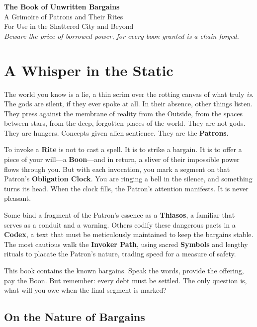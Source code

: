 \documentclass[10pt, twoside]{book}
\begin{document}
\begin{titlepage}
    \centering
    {\Huge\bfseries The Book of Unwritten Bargains}\\[2cm]
    {\Large A Grimoire of Patrons and Their Rites}\\[1cm]
    {\large For Use in the Shattered City and Beyond}\\[3cm]
    \vfill
    {\itshape Beware the price of borrowed power, for every boon granted is a chain forged.}\\
\end{titlepage}

\chapter*{A Whisper in the Static}

The world you know is a lie, a thin scrim over the rotting canvas of what truly \textit{is}. The gods are silent, if they ever spoke at all. In their absence, other things listen. They press against the membrane of reality from the Outside, from the spaces between stars, from the deep, forgotten places of the world. They are not gods. They are hungers. Concepts given alien sentience. They are the \textbf{Patrons}.

To invoke a \textbf{Rite} is not to cast a spell. It is to strike a bargain. It is to offer a piece of your will—a \textbf{Boon}—and in return, a sliver of their impossible power flows through you. But with each invocation, you mark a segment on that Patron's \textbf{Obligation Clock}. You are ringing a bell in the silence, and something turns its head. When the clock fills, the Patron's attention manifests. It is never pleasant.

Some bind a fragment of the Patron's essence as a \textbf{Thiasos}, a familiar that serves as a conduit and a warning. Others codify these dangerous pacts in a \textbf{Codex}, a text that must be meticulously maintained to keep the bargains stable. The most cautious walk the \textbf{Invoker Path}, using sacred \textbf{Symbols} and lengthy rituals to placate the Patron's nature, trading speed for a measure of safety.

This book contains the known bargains. Speak the words, provide the offering, pay the Boon. But remember: every debt must be settled. The only question is, what will you owe when the final segment is marked?

\section*{On the Nature of Bargains}
\end{document}
